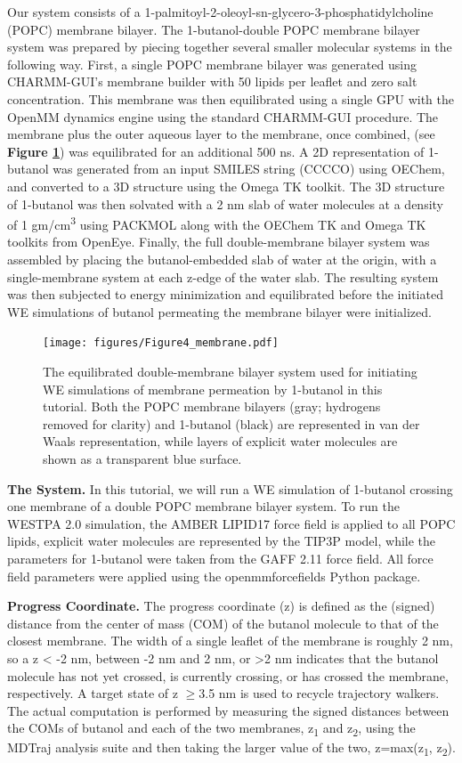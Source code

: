 Our system consists of a 1-palmitoyl-2-oleoyl-sn-glycero-3-phosphatidylcholine (POPC) membrane bilayer. 
The 1-butanol-double POPC membrane bilayer system was prepared by piecing together several smaller molecular systems in the following way.
First, a single POPC membrane bilayer was generated using CHARMM-GUI’s membrane builder with 50 lipids per leaflet and zero salt concentration. 
This membrane was then equilibrated using a single GPU with the OpenMM dynamics engine using the standard CHARMM-GUI procedure. 
The membrane plus the outer aqueous layer to the membrane, once combined, (see \textbf{Figure \ref{fig:bilayer-butanol}}) was equilibrated for an additional 500 ns.
A 2D representation of 1-butanol was generated from an input SMILES string (CCCCO) using OEChem, and converted to a 3D structure using the Omega TK toolkit. 
The 3D structure of 1-butanol was then solvated with a 2 nm slab of water molecules at a density of 1 gm/cm\textsuperscript{3} using PACKMOL along with the OEChem TK and Omega TK toolkits from OpenEye.
Finally, the full double-membrane bilayer system was assembled by placing the butanol-embedded slab of water at the origin, with a single-membrane system at each z-edge of the water slab. 
The resulting system was then subjected to energy minimization and equilibrated before the initiated WE simulations of butanol permeating the membrane bilayer were initialized. 

\begin{figure}[t]
\centering
\texttt{[image: figures/Figure4\_membrane.pdf]}
\caption{The equilibrated double-membrane bilayer system used for initiating WE simulations of membrane permeation by 1-butanol in this tutorial. 
Both the POPC membrane bilayers (gray; hydrogens removed for clarity) and 1-butanol (black) are represented in van der Waals representation, while layers of explicit water molecules are shown as a transparent blue surface.}
\label{fig:bilayer-butanol}
\end{figure}

\textbf{The System.} In this tutorial, we will run a WE simulation of 1-butanol crossing one membrane of a double POPC membrane bilayer system. 
To run the WESTPA 2.0 simulation, the AMBER LIPID17 force field is applied to all POPC lipids, explicit water molecules are represented by the TIP3P model, while the parameters for 1-butanol were taken from the GAFF 2.11 force field. 
All force field parameters were applied using the openmmforcefields Python package.

\textbf{Progress Coordinate.} The progress coordinate (z) is defined as the (signed) distance from the center of mass (COM) of the butanol molecule to that of the closest membrane. 
The width of a single leaflet of the membrane is roughly 2 nm, so a z < -2 nm, between -2 nm and 2 nm, or >2 nm indicates that the butanol molecule has not yet crossed, is currently crossing, or has crossed the membrane, respectively. 
A target state of z $\geq$3.5 nm is used to recycle trajectory walkers. 
The actual computation is performed by measuring the signed distances between the COMs of butanol and each of the two membranes, z\textsubscript{1} and z\textsubscript{2}, using the MDTraj analysis suite and then taking the larger value of the two, z=max(z\textsubscript{1}, z\textsubscript{2}).

